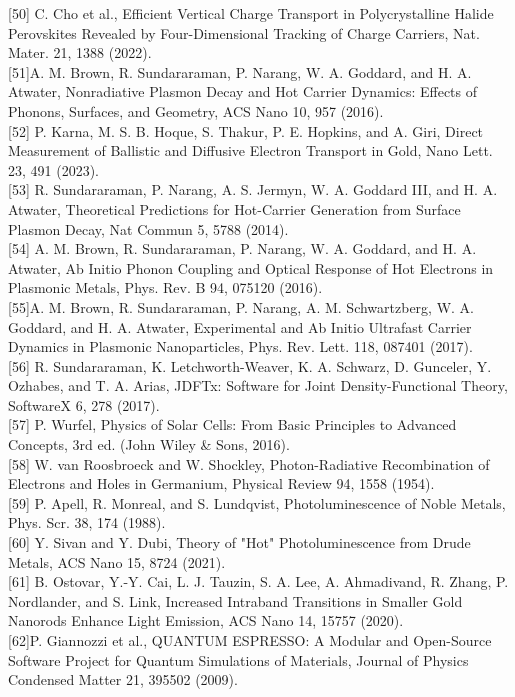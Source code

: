 \documentclass[10pt]{article}
\begin{document}
[50] C. Cho et al., Efficient Vertical Charge Transport in Polycrystalline Halide Perovskites Revealed by Four-Dimensional Tracking of Charge Carriers, Nat. Mater. 21, 1388 (2022).\\[0pt]
[51]A. M. Brown, R. Sundararaman, P. Narang, W. A. Goddard, and H. A. Atwater, Nonradiative Plasmon Decay and Hot Carrier Dynamics: Effects of Phonons, Surfaces, and Geometry, ACS Nano 10, 957 (2016).\\[0pt]
[52] P. Karna, M. S. B. Hoque, S. Thakur, P. E. Hopkins, and A. Giri, Direct Measurement of Ballistic and Diffusive Electron Transport in Gold, Nano Lett. 23, 491 (2023).\\[0pt]
[53] R. Sundararaman, P. Narang, A. S. Jermyn, W. A. Goddard III, and H. A. Atwater, Theoretical Predictions for Hot-Carrier Generation from Surface Plasmon Decay, Nat Commun 5, 5788 (2014).\\[0pt]
[54] A. M. Brown, R. Sundararaman, P. Narang, W. A. Goddard, and H. A. Atwater, Ab Initio Phonon Coupling and Optical Response of Hot Electrons in Plasmonic Metals, Phys. Rev. B 94, 075120 (2016).\\[0pt]
[55]A. M. Brown, R. Sundararaman, P. Narang, A. M. Schwartzberg, W. A. Goddard, and H. A. Atwater, Experimental and Ab Initio Ultrafast Carrier Dynamics in Plasmonic Nanoparticles, Phys. Rev. Lett. 118, 087401 (2017).\\[0pt]
[56] R. Sundararaman, K. Letchworth-Weaver, K. A. Schwarz, D. Gunceler, Y. Ozhabes, and T. A. Arias, JDFTx: Software for Joint Density-Functional Theory, SoftwareX 6, 278 (2017).\\[0pt]
[57] P. Wurfel, Physics of Solar Cells: From Basic Principles to Advanced Concepts, 3rd ed. (John Wiley \& Sons, 2016).\\[0pt]
[58] W. van Roosbroeck and W. Shockley, Photon-Radiative Recombination of Electrons and Holes in Germanium, Physical Review 94, 1558 (1954).\\[0pt]
[59] P. Apell, R. Monreal, and S. Lundqvist, Photoluminescence of Noble Metals, Phys. Scr. 38, 174 (1988).\\[0pt]
[60] Y. Sivan and Y. Dubi, Theory of "Hot" Photoluminescence from Drude Metals, ACS Nano 15, 8724 (2021).\\[0pt]
[61] B. Ostovar, Y.-Y. Cai, L. J. Tauzin, S. A. Lee, A. Ahmadivand, R. Zhang, P. Nordlander, and S. Link, Increased Intraband Transitions in Smaller Gold Nanorods Enhance Light Emission, ACS Nano 14, 15757 (2020).\\[0pt]
[62]P. Giannozzi et al., QUANTUM ESPRESSO: A Modular and Open-Source Software Project for Quantum Simulations of Materials, Journal of Physics Condensed Matter 21, 395502 (2009).\\[0pt]
\end{document}
